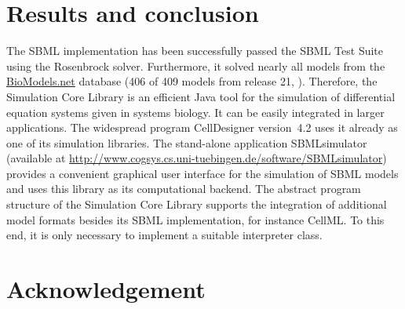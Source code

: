 \documentclass{bioinfo}
\begin{document}


%
%

\section{Results and conclusion}
The SBML implementation has been successfully passed the
SBML Test Suite using the Rosenbrock solver.
Furthermore, it solved nearly all models from the
\href{http://biomodels.net}{BioModels.net} database (406 of 409 models from
release 21, \citealp{Novere2006a}).
Therefore, the Simulation Core Library is an efficient Java tool for the
simulation of differential equation systems given in systems biology. It can be
easily integrated in larger applications.
The widespread program CellDesigner version~4.2 \citep{Funahashi2003} uses it
already as one of its simulation libraries.
The stand-alone application SBMLsimulator (available at
\href{http://www.cogsys.cs.uni-tuebingen.de/software/SBMLsimulator}{http://www.cogsys.cs.uni-tuebingen.de/software/SBMLsimulator})
provides a convenient graphical user interface for the simulation of SBML
models and uses this library as its computational backend.
The abstract program structure of the Simulation Core Library supports the
integration of additional model formats besides its SBML implementation, for
instance CellML. To this end, it is only necessary to implement a suitable
interpreter class.

\section*{Acknowledgement}
\end{document}
